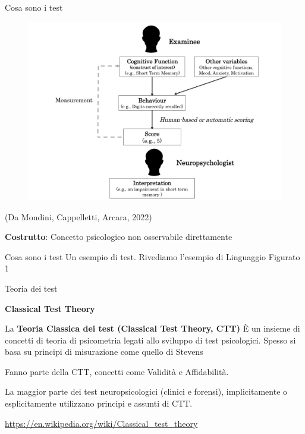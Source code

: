 \documentclass[
  ignorenonframetext,
]{beamer}
\begin{document}
\begin{frame}{Cosa sono i test}
\label{cosa-sono-i-test-2}
\begin{figure}
  \includegraphics[scale=0.3]{Figures/measurement_diagramma.png}
\end{figure}

\begin{flushright}
  (Da Mondini, Cappelletti, Arcara, 2022)
\end{flushright}

\textbf{Costrutto}: Concetto psicologico non osservabile direttamente
\end{frame}

\begin{frame}{Cosa sono i test}
\label{cosa-sono-i-test-3}
Un esempio di test. Rivediamo l'esempio di Linguaggio Figurato 1
\end{frame}

\begin{frame}{Teoria dei test}
\label{teoria-dei-test}
\begin{center}
  \textbf{Classical Test Theory}
\end{center}

La \textbf{Teoria Classica dei test (Classical Test Theory, CTT)} È un
insieme di concetti di teoria di psicometria legati allo sviluppo di
test psicologici. Spesso si basa su principi di misurazione come quello
di Stevens \pause

Fanno parte della CTT, concetti come Validità e Affidabilità. \pause

La maggior parte dei test neuropsicologici (clinici e forensi),
implicitamente o esplicitamente utilizzano principi e assunti di CTT.

\url{https://en.wikipedia.org/wiki/Classical_test_theory}
\end{frame}
\end{document}
